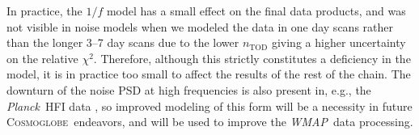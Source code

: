 \documentclass[twocolumn]{../../common/aa}
\def\WMAP{\emph{WMAP}}
\def\Planck{\emph{Planck}}
\newcommand{\cosmoglobe}{\textsc{Cosmoglobe}}
\newcommand{\Ka}[0]{\textit{Ka}}
\begin{document}
In practice, the $1/f$ model has a small effect on the final data products, and
was not visible in noise models when we modeled the data in one day scans
rather than the longer 3--7 day scans due to the lower $n_\mathrm{TOD}$ giving
a higher uncertainty on the relative $\chi^2$.  Therefore, although this
strictly constitutes a deficiency in the model, it is in practice too small to
affect the results of the rest of the chain. The downturn of the noise PSD at
high frequencies is also present in, e.g., the \Planck\ HFI data
\citep[Fig.~1]{planck2014-a10}, so improved modeling of this form will be a
necessity in future \cosmoglobe\ endeavors, and will be used to improve the
\WMAP\ data processing.








%










\end{document}
